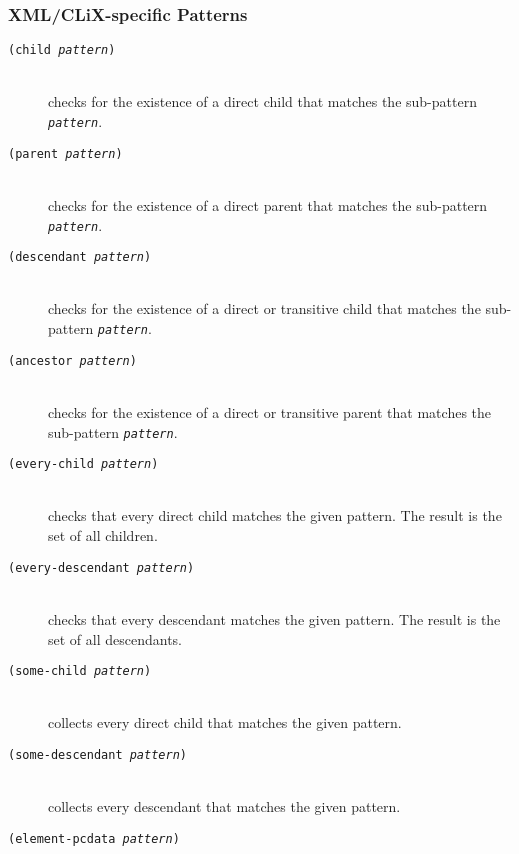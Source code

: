 \documentclass[a4paper,11pt]{scrartcl}
\begin{document}
\subsubsection{XML/CLiX-specific Patterns}

\begin{description}
\item[\texttt{(child \textsl{pattern})}]\hspace{2cm}\\
  checks for the existence of a direct child that matches the
  sub-pattern \texttt{\textsl{pattern}}.
\item[\texttt{(parent \textsl{pattern})}]\hspace{2cm}\\
 checks for the existence of a direct parent that matches the
 sub-pattern \texttt{\textsl{pattern}}.
\item[\texttt{(descendant \textsl{pattern})}]\hspace{2cm}\\
  checks for the existence of a direct or transitive child that
  matches the sub-pattern \texttt{\textsl{pattern}}.
\item[\texttt{(ancestor \textsl{pattern})}]\hspace{2cm}\\
 checks for the existence of a direct or transitive parent that
 matches the sub-pattern \texttt{\textsl{pattern}}.
\item[\texttt{(every-child \textsl{pattern})}]\hspace{2cm}\\
  checks that every direct child matches the given pattern.  The
  result is the set of all children.
\item[\texttt{(every-descendant \textsl{pattern})}]\hspace{2cm}\\
  checks that every descendant matches the given pattern.  The result
  is the set of all descendants.
\item[\texttt{(some-child \textsl{pattern})}]\hspace{2cm}\\
  collects every direct child that matches the given pattern.
\item[\texttt{(some-descendant \textsl{pattern})}]\hspace{2cm}\\
  collects every descendant that matches the given pattern.
\item[\texttt{(element-pcdata \textsl{pattern})}]\hspace{2cm}\\

\end{description}
\end{document}
